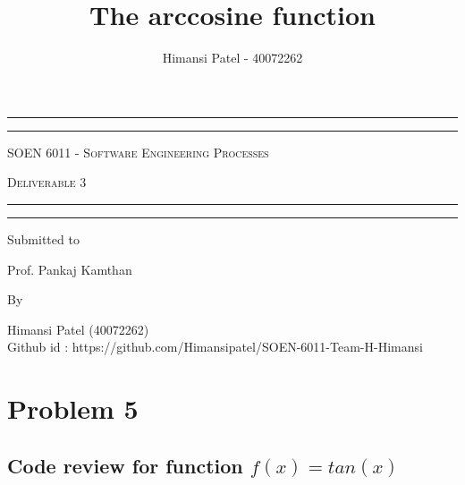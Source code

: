 \documentclass[a4paper,11pt]{report}
\title{The arccosine function}
\author{Himansi Patel - 40072262}
\begin{document}
\begin{titlepage}
	\centering 
	
	\vspace*{4\baselineskip} 
	
	\rule{\textwidth}{1.6pt}\vspace*{-\baselineskip}\vspace*{2pt} 
	\rule{\textwidth}{0.4pt} 
	
	\vspace{0.75\baselineskip} 
	
	{\scshape \LARGE SOEN 6011 - Software Engineering Processes\\}
	
	{\scshape \LARGE Deliverable 3\\} 
	
	\vspace{0.75\baselineskip}
	
	\rule{\textwidth}{0.4pt}\vspace*{-\baselineskip}\vspace{3.2pt} 
	\rule{\textwidth}{1.6pt}
	
	\vspace{2\baselineskip} 
	
	\vspace*{3\baselineskip} 

	{\Large Submitted to\\ } 
	
	\vspace{0.2\baselineskip} 
	
	{\Large Prof. Pankaj Kamthan \\} 
	
	
	\vspace*{3\baselineskip} 
	
	{\Large By\\ } 
	\vspace{0.2\baselineskip} 
	
	{\Large Himansi Patel (40072262)\\ } 
	{\large Github id : https://github.com/Himansipatel/SOEN-6011-Team-H-Himansi \\}

\end{titlepage}
\newpage
\tableofcontents
\newpage
\section{Problem 5}
\subsection{Code review for function $f(x)=tan(x)$}
\end{document}

